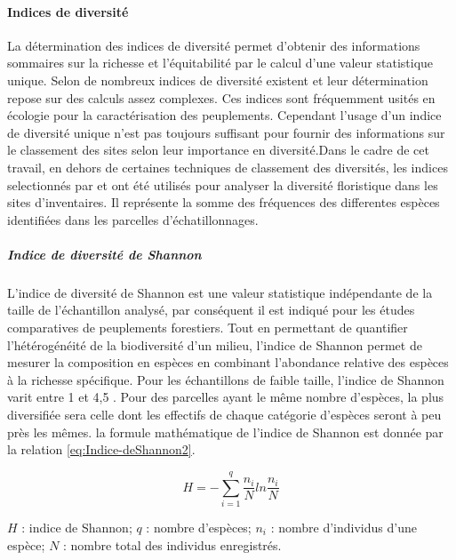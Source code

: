 \documentclass[
  12pt,
  a4paper,
  extrafontsizes,
  onecolumn,
  openright]{book}
\theoremstyle{definition}
\theoremstyle{definition}
\theoremstyle{definition}
\theoremstyle{definition}
\theoremstyle{remark}
\begin{document}
\hypertarget{indices-de-diversituxe9}{%
\paragraph{Indices de diversité}\label{indices-de-diversituxe9}}

La détermination des indices de diversité permet d'obtenir des informations sommaires sur la richesse et l'équitabilité par le calcul d'une valeur statistique unique. Selon \citet{Gosselin_Laroussinie2004} de nombreux indices de diversité existent et leur détermination repose sur des calculs assez complexes. Ces indices sont fréquemment usités en écologie pour la caractérisation des peuplements\citep{Ramade1994}. Cependant l'usage d'un indice de diversité unique n'est pas toujours suffisant pour fournir des informations sur le classement des sites selon leur importance en diversité.Dans le cadre de cet travail, en dehors de certaines techniques de classement des diversités, les indices selectionnés par \citet{Picard_Gourlet-Fleury2008} et \citet{Mounmemi2021} ont été utilisés pour analyser la diversité floristique dans les sites d'inventaires. Il représente la somme des fréquences des differentes espèces identifiées dans les parcelles d'échatillonnages.

\hypertarget{indice-de-diversituxe9-de-shannon}{%
\subparagraph{Indice de diversité de Shannon}\label{indice-de-diversituxe9-de-shannon}}

L'indice de diversité de Shannon est une valeur statistique indépendante de la taille de l'échantillon analysé, par conséquent il est indiqué pour les études comparatives de peuplements forestiers. Tout en permettant de quantifier l'hétérogénéité de la biodiversité d'un milieu, l'indice de Shannon permet de mesurer la composition en espèces en combinant l'abondance relative des espèces à la richesse spécifique. Pour les échantillons de faible taille, l'indice de Shannon varit entre 1 et 4,5 \citep{Riera_Alexandre2004}. Pour des parcelles ayant le même nombre d'espèces, la plus diversifiée sera celle dont les effectifs de chaque catégorie d'espèces seront à peu près les mêmes. la formule mathématique de l'indice de Shannon \citep{Shannon1948} est donnée par la relation \eqref{eq:Indice-deShannon2}.

\begin{equation}
H=-\sum_{i=1}^q\frac{n_i}{N}ln\frac{n_i}{N}
\label{eq:Indice-deShannon2}
\end{equation}

\(H\) : indice de Shannon;
\(q\) : nombre d'espèces;
\(n_i\) : nombre d'individus d'une espèce;
\(N\) : nombre total des individus enregistrés.
\end{document}
